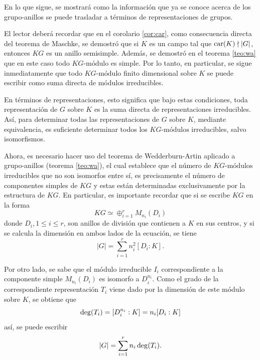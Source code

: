  En lo que sigue, se mostrará como la información que ya se conoce acerca de los grupo-anillos se puede trasladar a términos de representaciones de grupos. 
 
 El lector deberá recordar que en el corolario \ref{cor:car}, como consecuencia directa del teorema de Maschke, se demostró que si $K$ es un campo tal que $\operatorname{car}(K) \nmid |G|$, entonces $KG$ es un anillo semisimple. Además, se demostró en el teorema \ref{teo:wa} que en este caso todo $KG\mbox{-módulo}$ es simple. Por lo tanto, en particular, se sigue inmediatamente que todo $KG\mbox{-módulo}$ finito dimensional sobre $K$ se puede escribir como suma directa de módulos irreducibles.
 
 En términos de representaciones, esto significa que bajo estas condiciones, toda representación de $G$ sobre $K$ es la suma directa de representaciones irreducibles. Así, para determinar todas las representaciones de $G$ sobre $K$, mediante equivalencia, es suficiente determinar todos los $KG\mbox{-módulos}$ irreducibles, salvo isomorfismos. 
 
 Ahora, es necesario hacer uso del teorema de Wedderburn-Artin aplicado a grupo-anillos (teorema \ref{teo:wa}), el cual establece que el número de $KG\mbox{-módulos}$ irreducibles que no son isomorfos entre sí, es precisamente el número de componentes simples de $KG$ y estas están determinadas exclusivamente por la estructura de $KG$. En particular, es importante recordar que si se escribe $KG$ en la forma
 \begin{equation*} KG \simeq \oplus_{i = 1}^{r}M_{n_i}(D_i) \end{equation*} donde $D_i, 1\leq i \leq r$, son anillos de división que contienen a $K$ en sus centros, y si se calcula la dimensión en ambos lados de la ecuación, se tiene
 \begin{equation*} |G| = \sum_{i = 1}^{r}n_{i}^2[D_i:K]. \end{equation*}
 
 Por otro lado, se sabe que el módulo irreducible $I_i$ correspondiente a la componente simple $M_{n_i}(D_i)$ es isomorfo a $D_{i}^{n_i}$. Como el grado de la correspondiente representación $T_i$ viene dado por la dimensión de este módulo sobre $K$, se obtiene que
 \begin{equation*}  \operatorname{deg} (T_i) = [D_{i}^{n_i}:K] = n_i[D_i:K] \end{equation*} así, se puede escribir \begin{equation*} |G| = \sum_{i = 1}^{r}n_i\operatorname{deg}(T_i). \end{equation*} 
 

